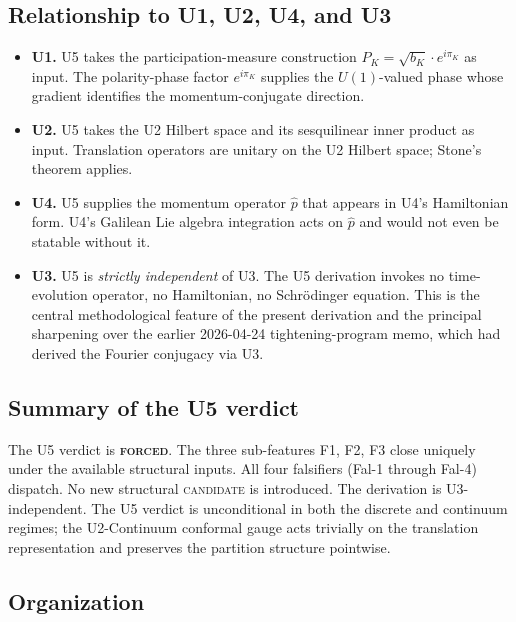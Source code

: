 \documentclass[11pt,a4paper]{article}
\begin{document}
\subsection{Relationship to U1, U2, U4, and U3}

\begin{itemize}
  \item \textbf{U1.} U5 takes the participation-measure construction $P_K = \sqrt{b_K} \cdot e^{i\pi_K}$ as input. The polarity-phase factor $e^{i\pi_K}$ supplies the $U(1)$-valued phase whose gradient identifies the momentum-conjugate direction.
  \item \textbf{U2.} U5 takes the U2 Hilbert space and its sesquilinear inner product as input. Translation operators are unitary on the U2 Hilbert space; Stone's theorem applies.
  \item \textbf{U4.} U5 supplies the momentum operator $\hat{p}$ that appears in U4's Hamiltonian form. U4's Galilean Lie algebra integration acts on $\hat{p}$ and would not even be statable without it.
  \item \textbf{U3.} U5 is \emph{strictly independent} of U3. The U5 derivation invokes no time-evolution operator, no Hamiltonian, no Schr\"odinger equation. This is the central methodological feature of the present derivation and the principal sharpening over the earlier 2026-04-24 tightening-program memo, which had derived the Fourier conjugacy via U3.
\end{itemize}

\subsection{Summary of the U5 verdict}

The U5 verdict is \textbf{\textsc{forced}}. The three sub-features F1, F2, F3 close uniquely under the available structural inputs. All four falsifiers (Fal-1 through Fal-4) dispatch. No new structural \textsc{candidate} is introduced. The derivation is U3-independent. The U5 verdict is unconditional in both the discrete and continuum regimes; the U2-Continuum conformal gauge acts trivially on the translation representation and preserves the partition structure pointwise.

\subsection{Organization}
\end{document}
